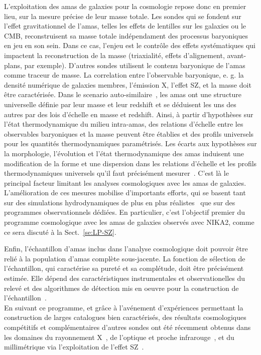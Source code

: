 L'exploitation des amas de galaxies pour la cosmologie repose donc en
premier lieu, sur la mesure précise de leur masse totale. Les sondes
qui se fondent sur l'effet gravitationnel de l'amas, telles les effets
de lentilles sur les galaxies ou le CMB, reconstruisent sa masse
totale indépendament des processus baryoniques en jeu en son
sein. Dans ce cas, l'enjeu est le contrôle des effets systématiques qui
impactent la reconstruction de la masse (triaxialité, effets
d'alignement, avant-plans, par exemple). D'autres sondes utilisent le
contenu baryonique de l'amas comme traceur de masse. La correlation
entre l'observable baryonique, e. g. la densité numérique de galaxies
membres, l'émission X, l'effet SZ, et la masse doit être
caractérisée. Dans le scenario auto-similaire~\citep{Kaiser1986}, les
amas ont une structure universelle définie par leur masse et leur
redshift et se déduisent les uns des autres par des lois d'échelle en
masse et redshift. Ainsi, à partir d'hypothèses sur l'état
thermodynamique du milieu intra-amas, des relations d'échelle entre
les observables baryoniques et la masse peuvent être établies et des
profils universels pour les quantités thermodynamiques
paramétrisés. Les écarts aux hypothèses sur la morphologie,
l'évolution et l'état thermodynamique des amas induisent une
modification de la forme et une dispersion dans les relations
d'échelle et les profils thermodynamiques universels qu'il faut
précisément mesurer~\citep{NFW1996, Nagai2007, Arnaud2010}. C'est là le
principal facteur limitant les analyses cosmologiques avec les amas de
galaxies. L'amélioration de ces mesures mobilise d'importants efforts,
qui se basent tant sur des simulations hydrodynamiques de plus en plus
réalistes~\citep[comme exemple récent]{Henden2019} que sur des programmes
observationnels dédiées. 
En particulier, c'est l'objectif premier du programme cosmologique
avec les amas de galaxies observés avec NIKA2, comme ce sera discuté à
la Sect.~\ref{se:LP-SZ}.

Enfin, l'échantillon d'amas inclus dans l'analyse cosmologique doit
pouvoir être relié à la population d'amas complète sous-jacente. La
fonction de sélection de l'échantillon, qui caractérise sa pureté et
sa complétude, doit être précisément estimée. Elle dépend des
caractéristiques instrumentales et observationelles du relevé et des
algorithmes de détection mis en oeuvre pour la construction de
l'échantillon~\citep[par exemple]{Melin2005}. \\

En suivant ce programme, et
grâce à l'avénement d'expériences permettant la construction de larges
catalogues bien caractérisés, des résultats cosmologiques compétitifs
et complémentaires d'autres sondes ont été récemment obtenus dans les
domaines du rayonnement X~\citep{Vikhlinin2009, Bohringer2014, Mantz2015, Marulli2018,
  Pacaud2018}, de l'optique et proche infrarouge~\citep{Rozo2010,
  Mana2013, Costanzi2019}, et du millimétrique via l'exploitation de
l'effet SZ~\citep{Hasselfield2013_ACT_SZ, Planck2016_ymap,
  Planck_2016_SZ_cosmo, Bolliet2018, Bolliet2019, deHaan2016,
  Bocquet2019, Salvati2018, Zulbedia2019}.

